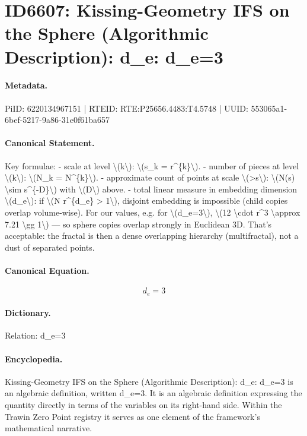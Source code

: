 \section*{ID6607: Kissing-Geometry IFS on the Sphere (Algorithmic Description): d\_e: d\_e=3}
\paragraph{Metadata.}
PiID: 6220134967151 | RTEID: RTE:P25656.4483:T4.5748 | UUID: 553065a1-6bef-5217-9a86-31e0f61ba657

\paragraph{Canonical Statement.}
Key formulae: - scale at level \textbackslash{}(k\textbackslash{}): \textbackslash{}(s\_k = r\textasciicircum{}\{k\}\textbackslash{}). - number of pieces at level \textbackslash{}(k\textbackslash{}): \textbackslash{}(N\_k = N\textasciicircum{}\{k\}\textbackslash{}). - approximate count of points at scale \textbackslash{}(>s\textbackslash{}): \textbackslash{}(N(s) \textbackslash{}sim s\textasciicircum{}\{-D\}\textbackslash{}) with \textbackslash{}(D\textbackslash{}) above. - total linear measure in embedding dimension \textbackslash{}(d\_e\textbackslash{}): if \textbackslash{}(N r\textasciicircum{}\{d\_e\} > 1\textbackslash{}), disjoint embedding is impossible (child copies overlap volume-wise). For our values, e.g. for \textbackslash{}(d\_e=3\textbackslash{}), \textbackslash{}(12 \textbackslash{}cdot r\textasciicircum{}3 \textbackslash{}approx 7.21 \textbackslash{}gg 1\textbackslash{}) — so sphere copies overlap strongly in Euclidean 3D. That’s acceptable: the fractal is then a dense overlapping hierarchy (multifractal), not a dust of separated points.

\paragraph{Canonical Equation.}
\[
d_e=3
\]

\paragraph{Dictionary.}
Relation: d\_e=3

\paragraph{Encyclopedia.}
Kissing-Geometry IFS on the Sphere (Algorithmic Description): d\_e: d\_e=3 is an algebraic definition, written d\_e=3. It is an algebraic definition expressing the quantity directly in terms of the variables on its right-hand side. Within the Trawin Zero Point registry it serves as one element of the framework's mathematical narrative.
